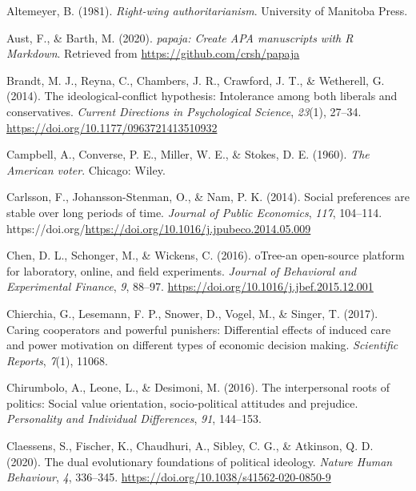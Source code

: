 \documentclass[
  man,floatsintext]{apa6}
\newlength{\cslhangindent}
\newlength{\cslentryspacingunit} %
\newenvironment{CSLReferences}[2] %
 {%
  \setlength{\parindent}{0pt}
  \ifodd #1
  \let\oldpar\par
  \def\par{\hangindent=\cslhangindent\oldpar}
  \fi
  \setlength{\parskip}{#2\cslentryspacingunit}
 }%
 {}
\begin{document}
\hypertarget{refs}{}
\begin{CSLReferences}{1}{0}
\leavevmode{}%
Altemeyer, B. (1981). \emph{Right-wing authoritarianism}. University of Manitoba Press.

\leavevmode{}%
Aust, F., \& Barth, M. (2020). \emph{{papaja}: {Create} {APA} manuscripts with {R Markdown}}. Retrieved from \url{https://github.com/crsh/papaja}

\leavevmode{}%
Brandt, M. J., Reyna, C., Chambers, J. R., Crawford, J. T., \& Wetherell, G. (2014). The ideological-conflict hypothesis: Intolerance among both liberals and conservatives. \emph{Current Directions in Psychological Science}, \emph{23}(1), 27--34. \url{https://doi.org/10.1177/0963721413510932}

\leavevmode{}%
Campbell, A., Converse, P. E., Miller, W. E., \& Stokes, D. E. (1960). \emph{The {A}merican voter}. Chicago: Wiley.

\leavevmode{}%
Carlsson, F., Johansson-Stenman, O., \& Nam, P. K. (2014). Social preferences are stable over long periods of time. \emph{Journal of Public Economics}, \emph{117}, 104--114. https://doi.org/\url{https://doi.org/10.1016/j.jpubeco.2014.05.009}

\leavevmode{}%
Chen, D. L., Schonger, M., \& Wickens, C. (2016). {oTree}-an open-source platform for laboratory, online, and field experiments. \emph{Journal of Behavioral and Experimental Finance}, \emph{9}, 88--97. \url{https://doi.org/10.1016/j.jbef.2015.12.001}

\leavevmode{}%
Chierchia, G., Lesemann, F. P., Snower, D., Vogel, M., \& Singer, T. (2017). Caring cooperators and powerful punishers: Differential effects of induced care and power motivation on different types of economic decision making. \emph{Scientific Reports}, \emph{7}(1), 11068.

\leavevmode{}%
Chirumbolo, A., Leone, L., \& Desimoni, M. (2016). The interpersonal roots of politics: Social value orientation, socio-political attitudes and prejudice. \emph{Personality and Individual Differences}, \emph{91}, 144--153.

\leavevmode{}%
Claessens, S., Fischer, K., Chaudhuri, A., Sibley, C. G., \& Atkinson, Q. D. (2020). The dual evolutionary foundations of political ideology. \emph{Nature Human Behaviour}, \emph{4}, 336--345. \url{https://doi.org/10.1038/s41562-020-0850-9}


\end{CSLReferences}
\end{document}

